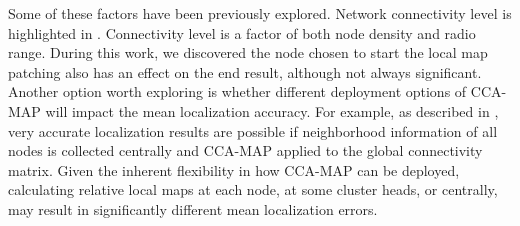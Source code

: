 Some of these factors have been previously explored.  Network connectivity level is highlighted in \cite{CCA-MAP09}.  Connectivity level is a factor of both node density and radio range.  During this work, we discovered the node chosen to start the local map patching also has an effect on the end result, although not always significant.  Another option worth exploring is whether different deployment options of CCA-MAP will impact the mean localization accuracy. For example, as described in \cite{CCA-MAP07}, very accurate localization results are possible if neighborhood information of all nodes is collected centrally and CCA-MAP applied to the global connectivity matrix. Given the inherent flexibility in how CCA-MAP can be deployed, calculating relative local maps at each node, at some cluster heads, or centrally, may result in significantly different mean localization errors.
